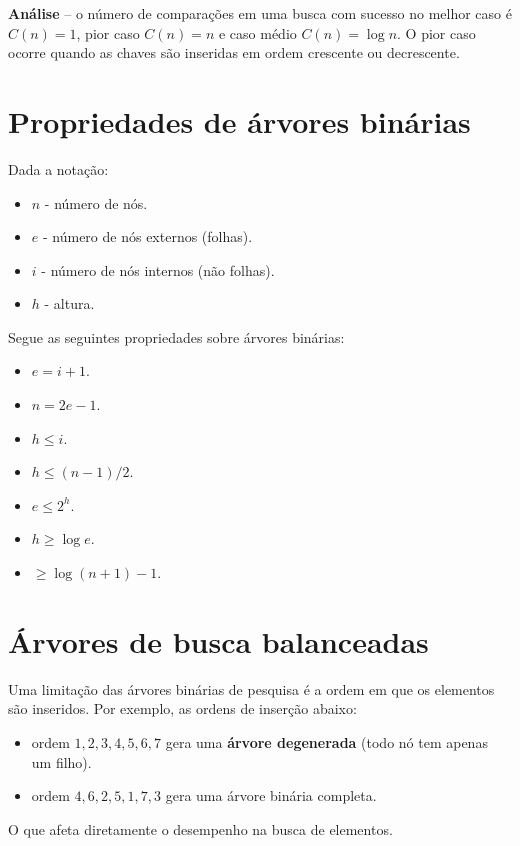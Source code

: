 {\bf Análise} -- o número de comparações em uma busca com sucesso no melhor caso é 
$C(n)= 1$, pior caso $C(n) = n$ e caso médio $C(n) = \log  n$.
O pior caso ocorre quando as chaves são inseridas em ordem crescente ou decrescente.

\section{Propriedades de árvores binárias}

Dada a notação:
\begin{itemize}
\item $n$ - número de nós.
\item $e$ - número de nós externos (folhas).
\item $i$ - número de nós internos (não folhas).
\item $h$ - altura.
\end{itemize}
Segue as seguintes propriedades sobre árvores binárias:
\begin{itemize}
\item $e = i + 1$.
\item $n = 2e - 1$.
\item $h \leq i$.
\item $h \leq (n-1)/2$.
\item $e \leq 2^h$.
\item $h \geq \log e$.
\item $ \geq \log (n+1) -1$.
\end{itemize}

\section{Árvores de busca balanceadas}

Uma limitação das árvores binárias de pesquisa é a ordem em que os elementos
são inseridos. Por exemplo, as ordens de inserção abaixo:
\begin{itemize}
\item ordem $1, 2, 3, 4, 5, 6, 7$ gera uma {\bf árvore degenerada} (todo nó
tem apenas um filho).
\item ordem $4, 6, 2, 5, 1, 7, 3$ gera uma árvore binária completa.
\end{itemize}
O que afeta diretamente o desempenho na busca de elementos.

